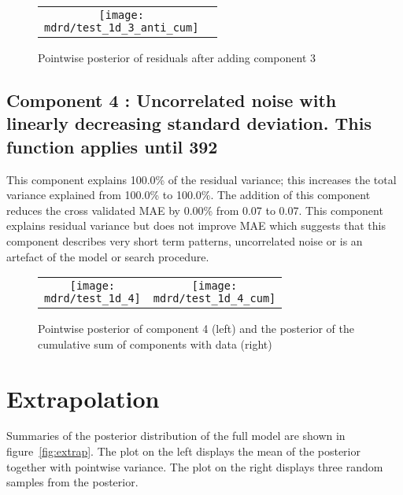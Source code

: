 \documentclass{article} %
\begin{document}
\begin{figure}[H]
\newcommand{\wmgd}{0.5\columnwidth}
\newcommand{\hmgd}{3.0cm}
\newcommand{\mdrd}{test_1d}
\newcommand{\mbm}{\hspace{-0.3cm}}
\begin{tabular}{cc}
\mbm \texttt{[image: \\mdrd/test\_1d\_3\_anti\_cum]}
\end{tabular}
\caption{Pointwise posterior of residuals after adding component 3}
\label{fig:comp3}
\end{figure}

\subsection{Component 4 : Uncorrelated noise with linearly decreasing standard deviation. This function applies until  392}



This component explains 100.0\% of the residual variance; this increases the total variance explained from 100.0\% to 100.0\%.
The addition of this component reduces the cross validated MAE by 0.00\% from 0.07 to 0.07.
This component explains residual variance but does not improve MAE which suggests that this component describes very short term patterns, uncorrelated noise or is an artefact of the model or search procedure.

\begin{figure}[H]
\newcommand{\wmgd}{0.5\columnwidth}
\newcommand{\hmgd}{3.0cm}
\newcommand{\mdrd}{test_1d}
\newcommand{\mbm}{\hspace{-0.3cm}}
\begin{tabular}{cc}
\mbm \texttt{[image: \\mdrd/test\_1d\_4]} & \texttt{[image: \\mdrd/test\_1d\_4\_cum]}
\end{tabular}
\caption{Pointwise posterior of component 4 (left) and the posterior of the cumulative sum of components with data (right)}
\label{fig:comp4}
\end{figure}

\section{Extrapolation}
\label{sec:extrap}

Summaries of the posterior distribution of the full model are shown in figure~\ref{fig:extrap}.
The plot on the left displays the mean of the posterior together with pointwise variance.
The plot on the right displays three random samples from the posterior.
\end{document}
